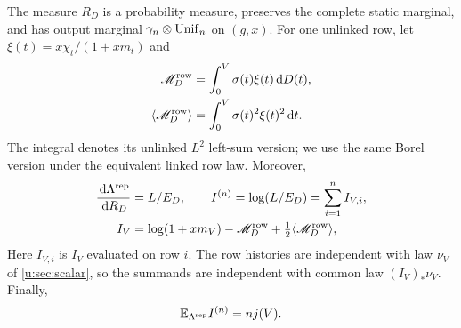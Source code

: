 \begin{lemma}
\label{u:lem:reference}
The measure $R_D$ is a probability measure, preserves the complete
static marginal, and has output marginal $\gamma_n\otimes \operatorname{Unif}_n$ on $(g,x)$.
For one unlinked row, let $\xi(t)=x\chi_t/(1+xm_t)$ and
\[
 \begin{aligned}
 \mathscr M_D^{\rm row}
   &=\int_0^V\sigma(t)\xi(t)\,\mathrm d D(t),\\
 \langle\mathscr M_D^{\rm row}\rangle
   &=\int_0^V\sigma(t)^2\xi(t)^2\,\mathrm d t.
 \end{aligned}
\]
The integral denotes its unlinked $L^2$ left-sum version;
we use the same Borel version under the equivalent linked row law.
Moreover,
\begin{equation}\label{u:eq:reference-ratio}
 \begin{aligned}
 \frac{\,\mathrm d\Lambda^{\rm rep}}{\,\mathrm d R_D}&=L/E_D,\qquad
 I^{(n)}=\log(L/E_D)=\sum_{i=1}^n I_{V,i},\\
 I_V&=\log(1+x m_V)-\mathscr M_D^{\rm row}
                   +\tfrac12\langle\mathscr M_D^{\rm row}\rangle,
 \end{aligned}
\end{equation}
Here $I_{V,i}$ is $I_V$ evaluated on row $i$.
The row histories are independent with law $\nu_V$ of
\cref{u:sec:scalar}, so the summands are independent with
common law $(I_V)_*\nu_V$.
Finally,
\begin{equation}\label{u:eq:reference-mean}
 \mathbb E_{\Lambda^{\rm rep}}I^{(n)}=n j(V).
\end{equation}
\end{lemma}
